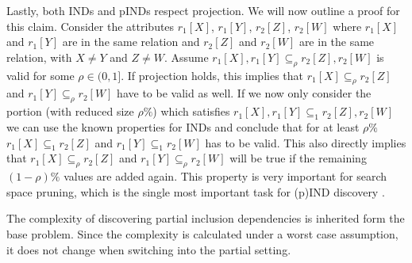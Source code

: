 Lastly, both INDs and pINDs respect projection. We will now outline a proof for this claim. Consider the attributes $r_1[X]$, $r_1[Y]$, $r_2[Z]$, $r_2[W]$ where $r_1[X]$ and $r_1[Y]$ are in the same relation and $r_2[Z]$ and $r_2[W]$ are in the same relation, with $X \not = Y$ and $Z \not = W$. Assume $r_1[X], r_1[Y] \subseteq_\rho r_2[Z], r_2[W]$ is valid for some $\rho \in (0, 1]$. If projection holds, this implies that $r_1[X] \subseteq_\rho r_2[Z]$ and $r_1[Y] \subseteq_\rho r_2[W]$ have to be valid as well. If we now only consider the portion (with reduced size $\rho\%$) which satisfies $r_1[X], r_1[Y] \subseteq_1 r_2[Z], r_2[W]$ we can use the known properties for INDs and conclude that for at least $\rho\%$ $r_1[X] \subseteq_1 r_2[Z]$ and $r_1[Y] \subseteq_1 r_2[W]$ has to be valid. This also directly implies that $r_1[X] \subseteq_\rho r_2[Z]$ and $r_1[Y] \subseteq_\rho r_2 [W]$ will be true if the remaining $(1-\rho)\%$ values are added again. This property is very important for search space pruning, which is the single most important task for (p)IND discovery \cite{liu2010discover}.

The complexity of discovering partial inclusion dependencies is inherited form the base problem. Since the complexity is calculated under a worst case assumption, it does not change when switching into the partial setting.

